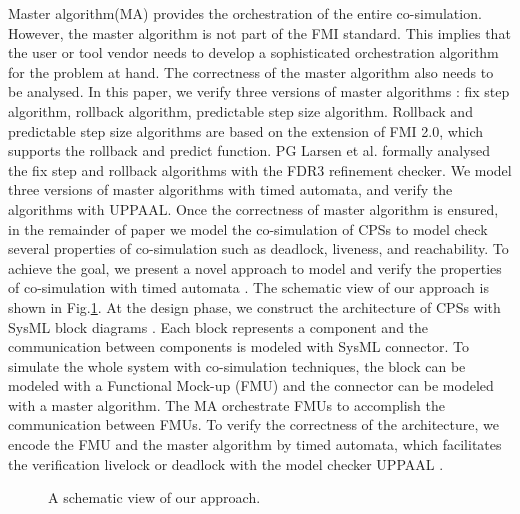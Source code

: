 Master algorithm(MA) \cite{AckerDVM15} provides the orchestration of the entire co-simulation. However, the master algorithm is not part of the FMI standard. This implies that the user or tool vendor needs to develop a sophisticated orchestration algorithm for the problem at hand. The correctness of the master algorithm also needs to be analysed. In this paper, we verify three versions of master algorithms \cite{BromanBGLMTW13}: fix step algorithm, rollback algorithm, predictable step size algorithm. Rollback and predictable step size algorithms are based on the extension of FMI 2.0, which supports the rollback and predict function. PG Larsen et al. \cite{Larsen2016Integrated} 
formally analysed the fix step and rollback algorithms with the FDR3 refinement checker. We model three versions of master algorithms with timed automata, and verify the algorithms with UPPAAL. Once the correctness of master algorithm is ensured, in the remainder of paper we model the co-simulation of CPSs to model check several properties of co-simulation such as deadlock, liveness, and reachability. 
To achieve the goal, we present a novel approach to model and verify the properties of co-simulation with timed automata \cite{AlurD94}. The schematic view of our approach is shown in Fig.\ref{paperarc}.
At the design phase, we construct the architecture of CPSs with SysML block diagrams \cite{RahimHI17}. Each block represents a component and the communication between components is modeled with SysML connector. To simulate the whole system with co-simulation techniques, the block can be modeled with a Functional Mock-up (FMU) and the connector can be modeled with a master algorithm. The MA orchestrate FMUs to accomplish the communication between FMUs. To verify the correctness of the architecture, we encode the FMU and the master algorithm by timed automata, which facilitates the verification livelock or deadlock with the model checker UPPAAL \cite{BehrmannDLHPYH06}.
\begin{figure}[htbp]
	\caption{A schematic view of our approach.}
	\label{paperarc}
\end{figure}

